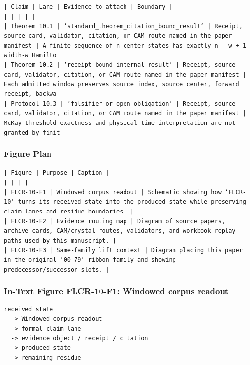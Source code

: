 \documentclass[11pt]{article}
\begin{document}
\noindent\texttt{| Claim | Lane | Evidence to attach | Boundary |}\\
\noindent\texttt{|---|---|---|---|}\\
\noindent\texttt{| Theorem 10.1 | `standard\_theorem\_citation\_bound\_result` | Receipt, source card, validator, citation, or CAM route named in the paper manifest | A finite sequence of n center states has exactly n - w + 1 width-w Hamilto}\\
\noindent\texttt{| Theorem 10.2 | `receipt\_bound\_internal\_result` | Receipt, source card, validator, citation, or CAM route named in the paper manifest | Each admitted window preserves source index, source center, forward receipt, backwa}\\
\noindent\texttt{| Protocol 10.3 | `falsifier\_or\_open\_obligation` | Receipt, source card, validator, citation, or CAM route named in the paper manifest | McKay threshold exactness and physical-time interpretation are not granted by finit}\\

\subsubsection*{Figure Plan}

\noindent\texttt{| Figure | Purpose | Caption |}\\
\noindent\texttt{|---|---|---|}\\
\noindent\texttt{| FLCR-10-F1 | Windowed corpus readout | Schematic showing how `FLCR-10` turns its received state into the produced state while preserving claim lanes and residue boundaries. |}\\
\noindent\texttt{| FLCR-10-F2 | Evidence routing map | Diagram of source papers, archive cards, CAM/crystal routes, validators, and workbook replay paths used by this manuscript. |}\\
\noindent\texttt{| FLCR-10-F3 | Same-family lift context | Diagram placing this paper in the original `00-79` ribbon family and showing predecessor/successor slots. |}\\

\subsubsection*{In-Text Figure FLCR-10-F1: Windowed corpus readout}

\begin{verbatim}
received state
  -> Windowed corpus readout
  -> formal claim lane
  -> evidence object / receipt / citation
  -> produced state
  -> remaining residue
\end{verbatim}
\end{document}
